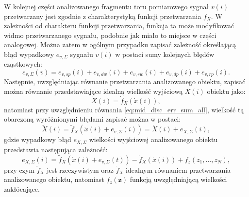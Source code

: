 W kolejnej części analizowanego fragmentu toru pomiarowego sygnał $v(i)$ przetwarzany jest zgodnie z charakterystyką funkcji przetwarzania $f_{X}$. W zależności od charakteru funkcji przetwarzania, funkcja ta może modyfikować widmo przetwarzanego sygnału, podobnie jak miało to miejsce w części analogowej. Można zatem w ogólnym przypadku zapisać zależność określającą błąd wypadkowy $e_{v,\Sigma}$ sygnału $v(i)$ w postaci sumy kolejnych błędów cząstkowych:
\begin{equation}
e_{v,\Sigma} \left( v \right) = e_{v,sp} \left( i \right) + e_{v,dw} \left( i \right) + e_{v,rw} \left( i \right) + e_{v,dp} \left( i \right) + e_{v,rp} \left( i \right) \label{eq:mid_disc_err_sum_all}.
\end{equation}
Następnie, uwzględniając równanie przetwarzania analizowanego obiektu, zapisać można równanie przedstawiające idealną wielkość wyjściową $X(i)$ obiektu jako:
\begin{equation}
\dot{X} \left( i \right) = \dot{f}_{X} \left( \dot{x} \left( i \right) \right) \label{eq:out_disc_ideal_all},
\end{equation}
natomiast przy uwzględnieniu równania \eqref{eq:mid_disc_err_sum_all}, wielkość tą obarczoną wyróżnionymi błędami zapisać można w postaci:
\begin{equation}
\tilde{X} \left( i \right) = \tilde{f}_{X} \left( \dot{x} \left( i \right) + e_{v,\Sigma} \left( i \right) \right) = \dot{X} \left( i \right) + e_{X,\Sigma} \left( i \right) \label{eq:out_disc_real_all},
\end{equation}
gdzie wypadkowy błąd $e_{X,\Sigma}$ wielkości wyjściowej analizowanego obiektu przedstawia następująca zależność:
\begin{equation}
e_{X,\Sigma} \left( i \right) = \tilde{f}_{X} \left( \dot{x} \left( i \right) + e_{v,\Sigma} \left( t \right) \right) - \dot{f}_{X} \left( \dot{x} \left( i \right) \right) + f_{z} \left( z_{1}, \hdots, z_{N} \right) \label{eq:out_disc_err_sum_all},
\end{equation}
przy czym $\tilde{f}_{X}$ jest rzeczywistym oraz $\dot{f}_{X}$ idealnym równaniem przetwarzania analizowanego obiektu, natomiast $f_{z}(\mathbf{z})$ funkcją uwzględniającą wielkości zakłócające.

